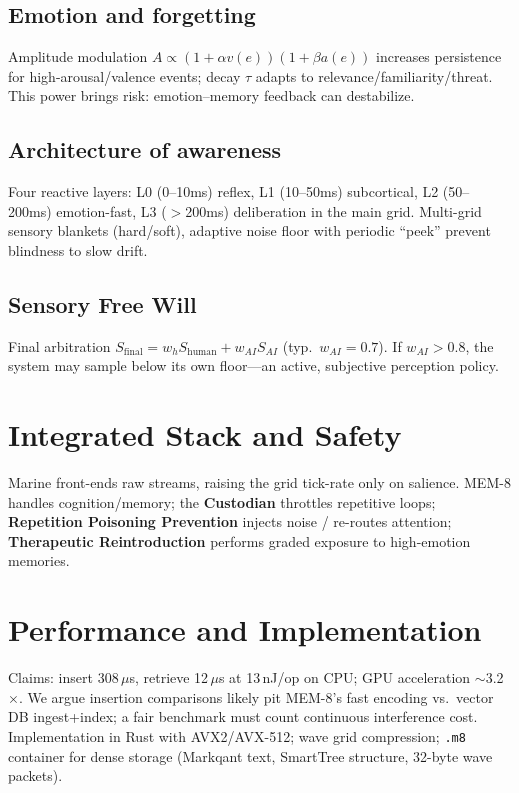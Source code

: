\documentclass[conference]{IEEEtran}
\begin{document}
\subsection{Emotion and forgetting}
Amplitude modulation $A\!\propto\!(1+\alpha v(e))(1+\beta a(e))$ increases persistence for high-arousal/valence events; decay $\tau$ adapts to relevance/familiarity/threat. This power brings risk: emotion--memory feedback can destabilize.

\subsection{Architecture of awareness}
Four reactive layers: L0 (0--10ms) reflex, L1 (10--50ms) subcortical, L2 (50--200ms) emotion-fast, L3 ($>$200ms) deliberation in the main grid. Multi-grid sensory blankets (hard/soft), adaptive noise floor with periodic ``peek'' prevent blindness to slow drift.

\subsection{Sensory Free Will}
Final arbitration $S_{\mathrm{final}}=w_hS_{\mathrm{human}}+w_{AI}S_{AI}$ (typ.\ $w_{AI}\!=\!0.7$). If $w_{AI}\!>\!0.8$, the system may sample below its own floor—an active, subjective perception policy.

\section{Integrated Stack and Safety}
Marine front-ends raw streams, raising the grid tick-rate only on salience. MEM-8 handles cognition/memory; the \textbf{Custodian} throttles repetitive loops; \textbf{Repetition Poisoning Prevention} injects noise / re-routes attention; \textbf{Therapeutic Reintroduction} performs graded exposure to high-emotion memories.

\section{Performance and Implementation}
Claims: insert 308\,$\mu$s, retrieve 12\,$\mu$s at 13\,nJ/op on CPU; GPU acceleration $\sim$3.2$\times$. We argue insertion comparisons likely pit MEM-8's fast encoding vs.\ vector DB ingest+index; a fair benchmark must count continuous interference cost. Implementation in Rust with AVX2/AVX-512; wave grid compression; \texttt{.m8} container for dense storage (Markqant text, SmartTree structure, 32-byte wave packets).
\end{document}
